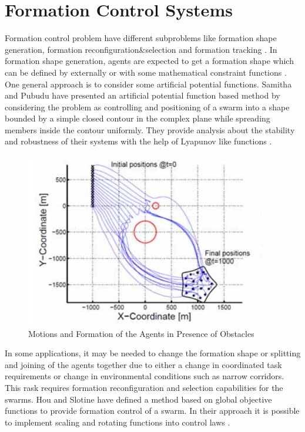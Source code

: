 \section{Formation Control Systems}
Formation control problem have different subproblems like formation shape generation, formation reconfiguration$\&$selection and formation tracking \cite{12}.  
In formation shape generation, agents are expected to get a formation shape which can be defined by externally or with some mathematical constraint functions \cite{16}.  One general approach is to consider some artificial potential functions. Samitha and Pubudu have presented an artificial potential function based method  by considering the problem as controlling and positioning of a swarm into a shape bounded by a simple closed contour in the complex plane while spreading members inside the contour uniformly.  They provide analysis about the stability and robustness of their systems with the help of Lyapunov like functions \cite{17}.

\begin{figure}[H]
	\caption{Motions and Formation of the Agents in Presence of Obstacles \cite{17}}
	\centering
	\includegraphics[scale = 0.7]{samitha}
\end{figure} 

In some applications, it may be needed to change the formation shape or splitting and joining of the agents together due to either a change in coordinated task requirements or change in environmental conditions such as narrow corridors.  This rask requires formation reconfiguration and selection capabilities for the swarms. Hou and Slotine have defined a method based on global objective functions to provide formation control of a swarm. In their approach it is possible to implement scaling and rotating functions into control laws \cite{8}.

